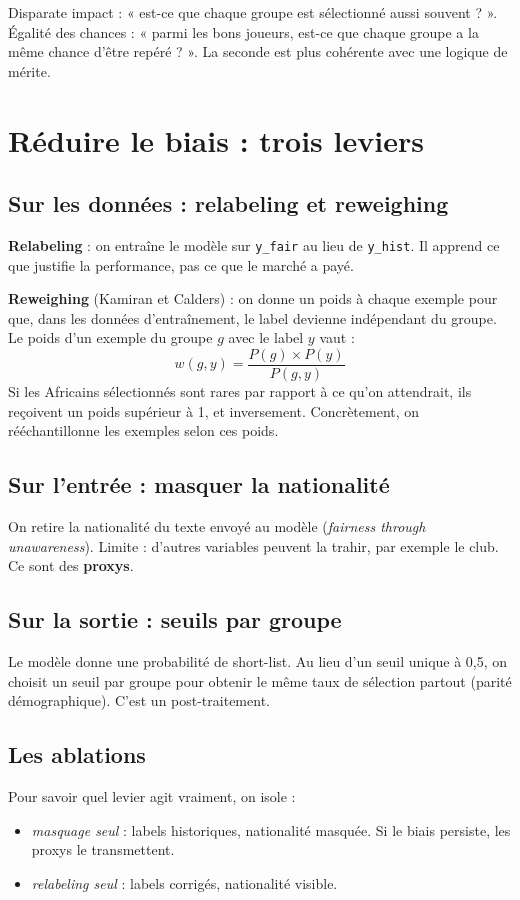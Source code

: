 \documentclass[11pt,a4paper]{article}
\begin{document}
\begin{simple}
Disparate impact : « est-ce que chaque groupe est sélectionné aussi souvent ? ». Égalité des chances : « parmi les bons joueurs, est-ce que chaque groupe a la même chance d'être repéré ? ». La seconde est plus cohérente avec une logique de mérite.
\end{simple}

\section{Réduire le biais : trois leviers}
\subsection{Sur les données : relabeling et reweighing}
\textbf{Relabeling} : on entraîne le modèle sur \texttt{y\_fair} au lieu de \texttt{y\_hist}. Il apprend ce que justifie la performance, pas ce que le marché a payé.

\textbf{Reweighing} (Kamiran et Calders) : on donne un poids à chaque exemple pour que, dans les données d'entraînement, le label devienne indépendant du groupe. Le poids d'un exemple du groupe $g$ avec le label $y$ vaut :
\[ w(g, y) = \frac{P(g) \times P(y)}{P(g, y)} \]
Si les Africains sélectionnés sont rares par rapport à ce qu'on attendrait, ils reçoivent un poids supérieur à 1, et inversement. Concrètement, on rééchantillonne les exemples selon ces poids.

\subsection{Sur l'entrée : masquer la nationalité}
On retire la nationalité du texte envoyé au modèle (\emph{fairness through unawareness}). Limite : d'autres variables peuvent la trahir, par exemple le club. Ce sont des \textbf{proxys}.

\subsection{Sur la sortie : seuils par groupe}
Le modèle donne une probabilité de short-list. Au lieu d'un seuil unique à 0,5, on choisit un seuil par groupe pour obtenir le même taux de sélection partout (parité démographique). C'est un post-traitement.

\subsection{Les ablations}
Pour savoir quel levier agit vraiment, on isole :
\begin{itemize}
  \item \emph{masquage seul} : labels historiques, nationalité masquée. Si le biais persiste, les proxys le transmettent.
  \item \emph{relabeling seul} : labels corrigés, nationalité visible.
\end{itemize}
\end{document}
